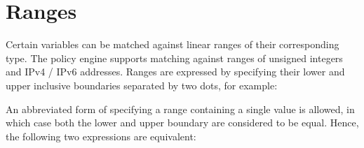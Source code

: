 \noindent{}

\section{Ranges}
Certain variables can be matched against linear ranges of their corresponding type.
The policy engine supports matching against ranges of unsigned integers and IPv4 / IPv6 addresses.
Ranges are expressed by specifying their lower and upper inclusive boundaries separated by two dots, for example:

\noindent{}

An abbreviated form of specifying a range containing a single value is allowed, in which case both the lower and upper boundary are considered to be equal.  Hence, the following two expressions are equivalent:

\noindent{}

